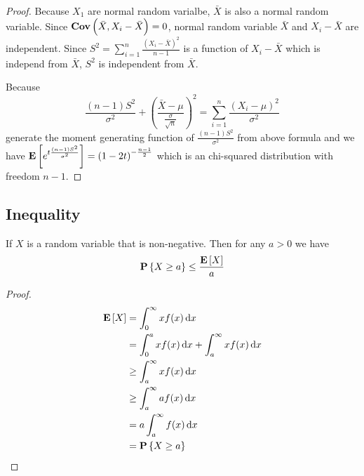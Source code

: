 \begin{proof}
    Because $X_1$ are normal random varialbe, $\bar{X}$ is also a normal random variable. Since $\mathop{\bf Cov\/}\displaystyle \left(\bar{X},X_i - \bar{X} \right) = 0$, normal random variable $\bar{X}$ and $X_i - \bar{X}$ are independent. Since $S^2 = \displaystyle \sum_{i=1}^n \frac{(X_i - \bar{X})^2}{n -1}$ is a function of $X_i - \bar{X}$ which is independ from $\bar{X}$, $S^2$ is independent from $\bar{X}$.
    
    Because 
    \begin{equation*}
        \frac{(n-1)S^2}{\sigma^2} + \left(\frac{\bar{X} - \mu}{\frac{\sigma}{\sqrt{n}}}\right)^2 = \sum_{i=1}^n \frac{(X_i - \mu)^2}{\sigma^2}
    \end{equation*}
    generate the moment generating function of $\displaystyle \frac{(n-1)S^2}{\sigma^2}$ from above formula and we have $\mathop{\bf E\/}\displaystyle \left[ e^{t \frac{(n-1)S^2}{\sigma^2}} \right] = \left(1-2t \right)^{- \frac{n-1}{2}}$ which is an chi-squared distribution with freedom $n-1$.
\end{proof}



\subsection{Inequality}

\begin{theorem}
If $X$ is a random variable that is non-negative. Then for any $a > 0$ we have 
\begin{equation}
    \mathop{\bf P\/}\displaystyle \left\{X \geq a\right\} \leq \frac{\mathop{\bf E\/}\displaystyle \left[ X \right]}{a}
\end{equation}    
\end{theorem}
\begin{proof}
    \begin{equation*}
        \begin{aligned}
            \expect{X} &= \int_0^\infty x f(x) \dif{x} \\
            &= \int_0^a x f(x) \dif{x} + \int_a^\infty x f(x) \dif{x} \\
            & \geq \int_a^\infty x f(x) \dif{x} \\
            & \geq \int_a^\infty a f(x) \dif{x} \\
            &= a \int_a^\infty f(x) \dif{x} \\
            &= \probability{X \geq a}
        \end{aligned}
    \end{equation*}
\end{proof}

